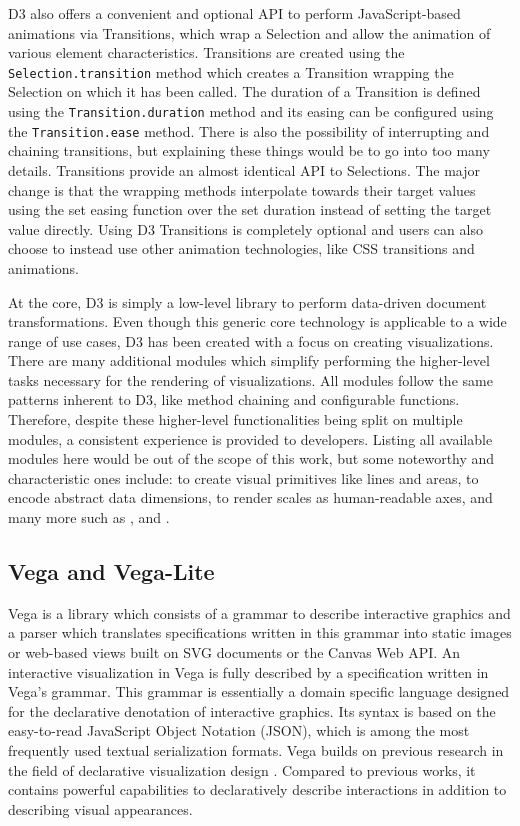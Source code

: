 D3 also offers a convenient and optional API to perform
JavaScript-based animations via Transitions, which wrap a Selection
and allow the animation of various element characteristics.
Transitions are created using the \lstinline{Selection.transition}
method which creates a Transition wrapping the Selection on which it
has been called.  The duration of a Transition is defined using the
\lstinline{Transition.duration} method and its easing can be
configured using the \lstinline{Transition.ease} method.  There is
also the possibility of interrupting and chaining transitions, but
explaining these things would be to go into too many details.
Transitions provide an almost identical API to Selections.  The major
change is that the wrapping methods interpolate towards their target
values using the set easing function over the set duration instead of
setting the target value directly.  Using D3 Transitions is completely
optional and users can also choose to instead use other animation
technologies, like CSS transitions and animations.

At the core, D3 is simply a low-level library to perform data-driven
document transformations.  Even though this generic core technology is
applicable to a wide range of use cases, D3 has been created with a
focus on creating visualizations.  There are many additional modules
which simplify performing the higher-level tasks necessary for the
rendering of visualizations.  All modules follow the same patterns
inherent to D3, like method chaining and configurable functions.
Therefore, despite these higher-level functionalities being split on
multiple modules, a consistent experience is provided to developers.
Listing all available modules here would be out of the scope of this
work, but some noteworthy and characteristic ones include:
 to create visual primitives like lines and areas,
 to encode abstract data dimensions,
 to render scales as human-readable axes, and many
more such as ,  and
.



\subsection{Vega and Vega-Lite}

Vega \parencite{Vega} is a library which consists of a grammar to
describe interactive graphics and a parser which translates
specifications written in this grammar into static images or web-based
views built on SVG documents or the Canvas Web API.  An interactive
visualization in Vega is fully described by a specification written in
Vega's grammar.  This grammar is essentially a domain specific
language designed for the declarative denotation of interactive
graphics.  Its syntax is based on the easy-to-read JavaScript Object
Notation (JSON), which is among the most frequently used textual
serialization formats.  Vega builds on previous research in the field
of declarative visualization design \parencite{GrammarOfGraphics}.
Compared to previous works, it contains powerful capabilities to
declaratively describe interactions \parencite{ReactiveVega} in
addition to describing visual appearances.

